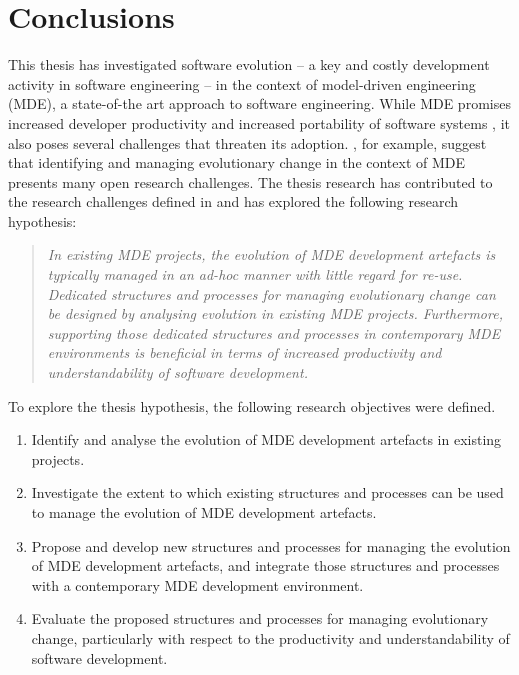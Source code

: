 
\chapter{Conclusions}
\label{Conclusion}

This thesis has investigated software evolution -- a key and costly development activity in software engineering \cite{moad90maintaining} -- in the context of model-driven engineering (MDE), a state-of-the art approach to software engineering. While MDE promises increased developer productivity \cite{watson08mdahistory} and increased portability of software systems \cite{frankel02mda}, it also poses several challenges that threaten its adoption. \cite{Mens07}, for example, suggest that identifying and managing evolutionary change in the context of MDE presents many open research challenges. The thesis research has contributed to the research challenges defined in \cite{Mens07} and has explored the following research hypothesis:

\begin{quote}
\emph{In existing MDE projects, the evolution of MDE development artefacts is typically managed in an ad-hoc manner with little regard for re-use. Dedicated structures and processes for managing evolutionary change can be designed by analysing evolution in existing MDE projects. Furthermore, supporting those dedicated structures and processes in contemporary MDE environments is beneficial in terms of increased productivity and understandability of software development.}
\end{quote} 

To explore the thesis hypothesis, the following research objectives were defined.

\begin{enumerate}
	\item Identify and analyse the evolution of MDE development artefacts in existing projects.
	\item Investigate the extent to which existing structures and processes can be used to manage the evolution of MDE development artefacts. 
	\item Propose and develop new structures and processes for managing the evolution of MDE development artefacts, and integrate those structures and processes with a contemporary MDE development environment.
	\item Evaluate the proposed structures and processes for managing evolutionary change, particularly with respect to the productivity and understandability of software development.
\end{enumerate}

